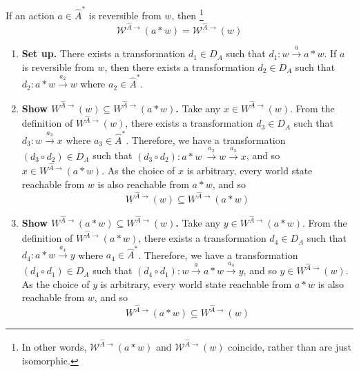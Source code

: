 \begin{propositionE}
\label{prp:reachable_subworld_reversible_action}
    If an action $a \in \hat{A}^{*}$ is reversible from $w$, then    \footnote{
    In other words, $\mathscr{W}^{\hat{A}\to}(a \ast w)$ and $\mathscr{W}^{\hat{A}\to}(w)$ coincide, rather than are just isomorphic.
    }
    \begin{equation}
        \mathscr{W}^{\hat{A}\to}(a \ast w) = \mathscr{W}^{\hat{A}\to}(w)
    \end{equation}
\end{propositionE}
\begin{proofE}
\begin{enumerate}
    \item \textbf{Set up.}
    There exists a transformation $d_{1} \in D_{A}$ such that $d_{1}: w \xrightarrow{a} a \ast w$.
    If $a$ is reversible from $w$, then there exists a transformation $d_{2} \in D_{A}$ such that $d_{2}: a \ast w \xrightarrow{a_{2}} w$ where $a_{2} \in \hat{A}^{*}$.
    
    \item \textbf{Show $W^{\hat{A}\to}(w) \subseteq W^{\hat{A}\to}(a \ast w)$.}
    Take any $x \in W^{\hat{A}\to}(w)$.
    From the definition of $W^{\hat{A}\to}(w)$, there exists a transformation $d_{3} \in D_{A}$ such that $d_{3}: w \xrightarrow{a_{3}} x$ where $a_{3} \in \hat{A}^{*}$.
    Therefore, we have a transformation $(d_{3} \circ d_{2}) \in D_{A}$ such that $(d_{3} \circ d_{2}): a \ast w \ \xrightarrow{a_{2}} w \xrightarrow{a_{3}} x$, and so $x \in W^{\hat{A}\to}(a \ast w)$.
    As the choice of $x$ is arbitrary, every world state reachable from $w$ is also reachable from $a \ast w$, and so
    \begin{equation}
        W^{\hat{A}\to}(w) \subseteq W^{\hat{A}\to}(a \ast w)
        \label{eqn:reachable_subworld_w_subset_reachable_subworld_result_reversible}
    \end{equation}

    \item \textbf{Show $W^{\hat{A}\to}(a \ast w) \subseteq W^{\hat{A}\to}(w)$.}
    Take any $y \in W^{\hat{A}\to}(a \ast w)$.
    From the definition of $W^{\hat{A}\to}(a \ast w)$, there exists a transformation $d_{4} \in D_{A}$ such that $d_{4}: a \ast w \xrightarrow{a_{4}} y$ where $a_{4} \in \hat{A}^{*}$.
    Therefore, we have a transformation $(d_{4} \circ d_{1}) \in D_{A}$ such that $(d_{4} \circ d_{1}): w \xrightarrow{a} a \ast w \xrightarrow{a_{4}} y$, and so $y \in W^{\hat{A}\to}(w)$.
    As the choice of $y$ is arbitrary, every world state reachable from $a \ast w$ is also reachable from $w$, and so
    \begin{equation}
        W^{\hat{A}\to}(a \ast w) \subseteq W^{\hat{A}\to}(w)
        \label{eqn:reachable_subworld_result_subset_reachable_subworld_w_reversible}
    \end{equation}


\end{enumerate}
\end{proofE}
